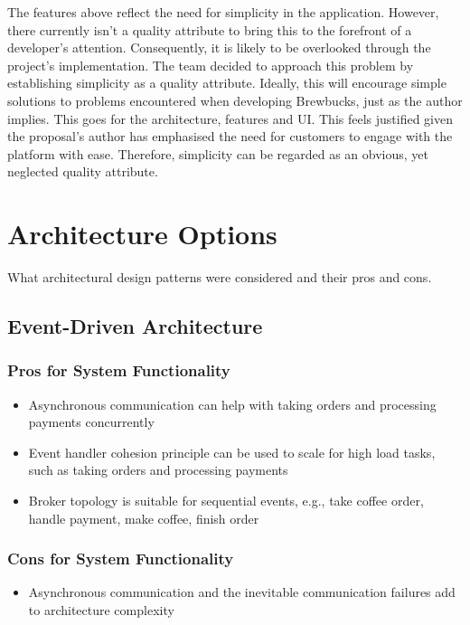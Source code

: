 \documentclass{article}
\begin{document}
\bigskip \noindent The features above reflect the need for simplicity in the application. However, there currently isn't a quality attribute to bring this to the forefront of a developer's attention. Consequently, it is likely to be overlooked through the project's implementation. The team decided to approach this problem by establishing simplicity as a quality attribute. Ideally, this will encourage simple solutions to problems encountered when developing Brewbucks, just as the author implies. This goes for the architecture, features and UI. This feels justified given the proposal's author has emphasised the need for customers to engage with the platform with ease. Therefore, simplicity can be regarded as an obvious, yet neglected quality attribute. 



\section{Architecture Options}
What architectural design patterns were considered and their pros and cons.

\subsection{Event-Driven Architecture}
\subsubsection*{Pros for System Functionality}
\begin{itemize}
    \item Asynchronous communication can help with taking orders and processing payments concurrently
    \item Event handler cohesion principle can be used to scale for high load tasks, such as taking orders and processing payments
    \item Broker topology is suitable for sequential events, e.g., take coffee order, handle payment, make coffee, finish order
\end{itemize}
\subsubsection*{Cons for System Functionality}
\begin{itemize}
    \item Asynchronous communication and the inevitable communication failures add to architecture complexity
\end{itemize}
\end{document}

